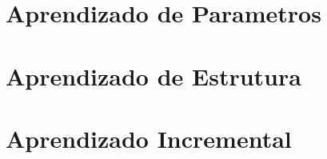 

\section{Aprendizado de Parametros}


\section{Aprendizado de Estrutura}


\section{Aprendizado Incremental}